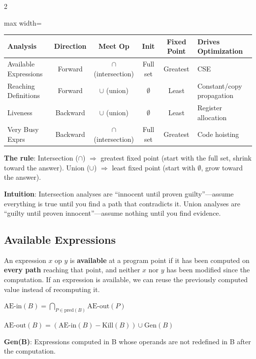 \documentclass[9pt,landscape]{extarticle}
\begin{document}
\begin{multicols}{2}
\begin{keybox}
\begin{adjustbox}{max width=\linewidth}
\begin{tabular}{@{}lccccl@{}}
\toprule
\textbf{Analysis} & \textbf{Direction} & \textbf{Meet Op} & \textbf{Init} & \textbf{Fixed Point} & \textbf{Drives Optimization} \\
\midrule
Available Expressions & Forward & $\cap$ (intersection) & Full set & Greatest & CSE \\
Reaching Definitions & Forward & $\cup$ (union) & $\emptyset$ & Least & Constant/copy propagation \\
Liveness & Backward & $\cup$ (union) & $\emptyset$ & Least & Register allocation \\
Very Busy Exprs & Backward & $\cap$ (intersection) & Full set & Greatest & Code hoisting \\
\bottomrule
\end{tabular}
\end{adjustbox}

\textbf{The rule}: Intersection ($\cap$) $\Rightarrow$ greatest fixed point (start with the full set, shrink toward the answer). Union ($\cup$) $\Rightarrow$ least fixed point (start with $\emptyset$, grow toward the answer).

\textbf{Intuition}: Intersection analyses are ``innocent until proven guilty''---assume everything is true until you find a path that contradicts it. Union analyses are ``guilty until proven innocent''---assume nothing until you find evidence.
\end{keybox}

\subsection{Available Expressions}

An expression $x$ op $y$ is \textbf{available} at a program point if it has been computed on \textbf{every path} reaching that point, and neither $x$ nor $y$ has been modified since the computation. If an expression is available, we can reuse the previously computed value instead of recomputing it.

$\text{AE-in}(B) = \displaystyle\bigcap_{P \in \text{pred}(B)} \text{AE-out}(P)$

$\text{AE-out}(B) = (\text{AE-in}(B) - \text{Kill}(B)) \cup \text{Gen}(B)$

\textbf{Gen(B)}: Expressions computed in B whose operands are not redefined in B after the computation.


\end{multicols}
\end{document}
